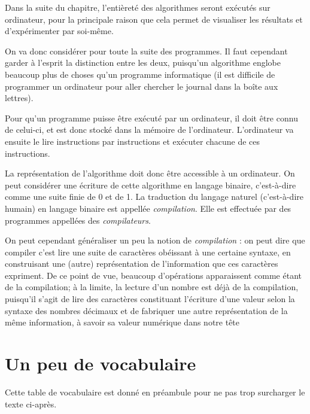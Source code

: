 \documentclass[../../main.tex]{subfiles}
\begin{document}
Dans la suite du chapitre, l'entièreté des algorithmes seront exécutés sur ordinateur, pour la principale raison que cela permet de visualiser les résultats et d'expérimenter par soi-même.

On va donc considérer pour toute la suite des programmes. Il faut cependant garder à l'esprit la distinction entre les deux, puisqu'un algorithme englobe beaucoup plus de choses qu'un programme informatique (il est difficile de programmer un ordinateur pour aller chercher le journal dans la boîte aux lettres).

Pour qu'un programme puisse être exécuté par un ordinateur, il doit être connu de celui-ci, et est donc stocké dans la mémoire de l'ordinateur. L'ordinateur va ensuite le lire instructions par instructions et exécuter chacune de ces instructions.

La représentation de l'algorithme doit donc être accessible à un ordinateur. On peut considérer une écriture de cette algorithme en langage binaire, c'est-à-dire comme une suite finie de 0 et de 1. La traduction du langage naturel (c'est-à-dire humain) en langage binaire est appellée \textit{compilation}. Elle est effectuée par des programmes appellées des \textit{compilateurs}.

On peut cependant généraliser un peu la notion de \textit{compilation} : on peut dire que compiler c'est lire une suite de caractères obéissant à une certaine syntaxe, en construisant une (autre) représentation de l'information que ces caractères expriment. De ce point
de vue, beaucoup d'opérations apparaissent comme étant de la compilation; à la limite, la lecture d'un nombre est déjà de la compilation, puisqu'il s'agit de lire des caractères constituant l'écriture d'une valeur selon la syntaxe des nombres décimaux et de fabriquer une autre représentation de la même information, à savoir sa valeur numérique \og dans notre tête \fg
\section{Un peu de vocabulaire}
Cette table de vocabulaire est donné en préambule pour ne pas trop surcharger le texte ci-après.

\end{document}

